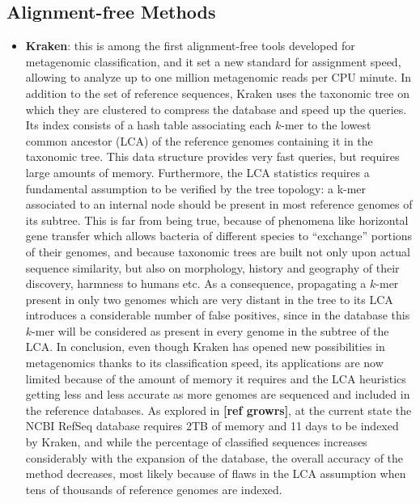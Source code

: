 \subsection{Alignment-free Methods}
\begin{itemize}
    \item \textbf{Kraken}: this is among the first alignment-free tools developed for metagenomic classification, and it set a new standard for assignment speed, allowing to analyze up to one million metagenomic reads per CPU minute. In addition to the set of reference sequences, Kraken uses the taxonomic tree on which they are clustered to compress the database and speed up the queries. Its index consists of a hash table associating each $k$-mer to the lowest common ancestor (LCA) of the reference genomes containing it in the taxonomic tree. This data structure provides very fast queries, but requires large amounts of memory. Furthermore, the LCA statistics requires a fundamental assumption to be verified by the tree topology: a k-mer associated to an internal node should be present in most reference genomes of its subtree. This is far from being true, because of phenomena like horizontal gene transfer which allows bacteria of different species to ``exchange'' portions of their genomes, and because taxonomic trees are built not only upon actual sequence similarity, but also on morphology, history and geography of their discovery, harmness to humans etc. As a consequence, propagating a $k$-mer present in only two genomes which are very distant in the tree to its LCA introduces a considerable number of false positives, since in the database this $k$-mer will be considered as present in every genome in the subtree of the LCA. In conclusion, even though Kraken has opened new possibilities in metagenomics thanks to its classification speed, its applications are now limited because of the amount of memory it requires and the LCA heuristics getting less and less accurate as more genomes are sequenced and included in the reference databases. As explored in \textbf{[ref growrs]}, at the current state the NCBI RefSeq database requires 2TB of memory and 11 days to be indexed by Kraken, and while the percentage of classified sequences increases considerably with the expansion of the database, the overall accuracy of the method decreases, most likely because of flaws in the LCA assumption when tens of thousands of reference genomes are indexed.

\end{itemize}
